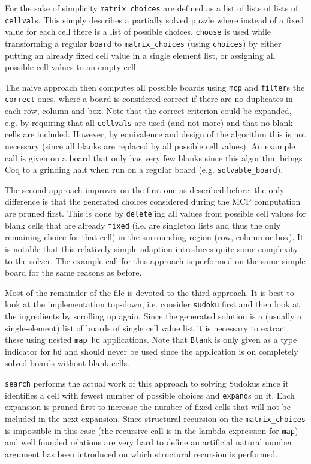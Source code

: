 \documentclass[a4paper,11pt]{article}
\begin{document}
For the sake of simplicity \texttt{matrix\_choices} are defined as a list of lists of lists of \texttt{cellval}s. This simply describes a partially solved puzzle where instead of a fixed value for each cell there is a list of possible choices. \texttt{choose} is used while transforming a regular \texttt{board} to \texttt{matrix\_choices} (using \texttt{choices}) by either putting an already fixed cell value in a single element list, or assigning all possible cell values to an empty cell.

The naive approach then computes all possible boards using \texttt{mcp} and \texttt{filter}s the \texttt{correct} ones, where a board is considered correct if there are no duplicates in each row, column and box. Note that the correct criterion could be expanded, e.g. by requiring that all \texttt{cellvals} are used (and not more) and that no blank cells are included. However, by equivalence and design of the algorithm this is not necessary (since all blanks are replaced by all possible cell values). An example call is given on a board that only has very few blanks since this algorithm brings Coq to a grinding halt when run on a regular board (e.g. \texttt{solvable\_board}).

The second approach improves on the first one as described before: the only difference is that the generated choices considered during the MCP computation are pruned first. This is done by \texttt{delete}'ing all values from possible cell values for blank cells that are already \texttt{fixed} (i.e. are singleton lists and thus the only remaining choice for that cell) in the surrounding region (row, column or box). It is notable that this relatively simple adaption introduces quite some complexity to the solver. The example call for this approach is performed on the same simple board for the same reasons as before.

Most of the remainder of the file is devoted to the third approach. It is best to look at the implementation top-down, i.e. consider \texttt{sudoku} first and then look at the ingredients by scrolling up again. Since the generated solution is a (usually a single-element) list of boards of single cell value list it is necessary to extract these using nested \texttt{map hd} applications. Note that \texttt{Blank} is only given as a type indicator for \texttt{hd} and should never be used since the application is on completely solved boards without blank cells.

\texttt{search} performs the actual work of this approach to solving Sudokus since it identifies a cell with fewest number of possible choices and \texttt{expand}s on it. Each expansion is pruned first to increase the number of fixed cells that will not be included in the next expansion. Since structural recursion on the \texttt{matrix\_choices} is impossible in this case (the recursive call is in the lambda expression for \texttt{map}) and well founded relations are very hard to define an artificial natural number argument has been introduced on which structural recursion is performed.
\end{document}
